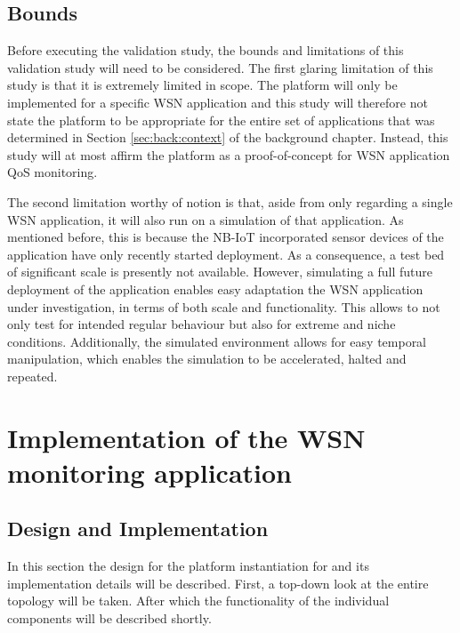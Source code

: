 \subsection{Bounds}
Before executing the validation study, the bounds and limitations of this validation study will need to be considered. The first glaring limitation of this study is that it is extremely limited in scope. The platform will only be implemented for a specific WSN application and this study will therefore not state the platform to be appropriate for the entire set of applications that was determined in Section \ref{sec:back:context} of the background chapter. Instead, this study will at most affirm the platform as a proof-of-concept for WSN application QoS monitoring.

The second limitation worthy of notion is that, aside from only regarding a single WSN application, it will also run on a simulation of that application. As mentioned before, this is because the NB-IoT incorporated sensor devices of the \sensit application have only recently started deployment. As a consequence, a test bed of significant scale is presently not available. However, simulating a full future deployment of the application enables easy adaptation the WSN application under investigation, in terms of both scale and functionality. This allows to not only test for intended regular behaviour but also for extreme and niche conditions. Additionally, the simulated environment allows for easy temporal manipulation, which enables the simulation to be accelerated, halted and repeated.

\section{Implementation of the WSN monitoring application}
\subsection{Design and Implementation}
In this section the design for the platform instantiation for \nedap\sensit and its implementation details will be described. First, a top-down look at the entire topology will be taken. After which the functionality of the individual components will be described shortly.

